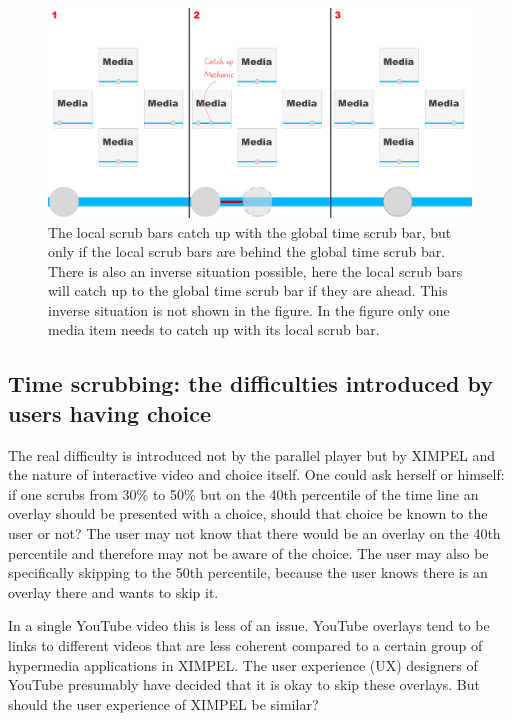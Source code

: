 \begin{figure}
\centering
\includegraphics[width=1.35\textwidth, center]{images/catch_up.png} %
\caption{The local scrub bars catch up with the global time scrub bar, but only if the local scrub bars are behind the global time scrub bar. There is also an inverse situation possible, here the local scrub bars will catch up to the global time scrub bar if they are ahead. This inverse situation is not shown in the figure. In the figure only one media item needs to catch up with its local scrub bar.}
\label{images:catch_up}
\end{figure}


\subsection{Time scrubbing: the difficulties introduced by users having choice}
The real difficulty is introduced not by the parallel player but by XIMPEL and the nature of interactive video and choice itself. One could ask herself or himself: if one scrubs from 30\% to 50\% but on the 40th percentile of the time line an overlay should be presented with a choice, should that choice be known to the user or not? The user may not know that there would be an overlay on the 40th percentile and therefore may not be aware of the choice. The user may also be specifically skipping to the 50th percentile, because the user knows there is an overlay there and wants to skip it.

In a single YouTube video this is less of an issue. YouTube overlays tend to be links to different videos that are less coherent compared to a certain group of hypermedia applications in XIMPEL. The user experience (UX) designers of YouTube presumably have decided that it is okay to skip these overlays. But should the user experience of XIMPEL be similar?

